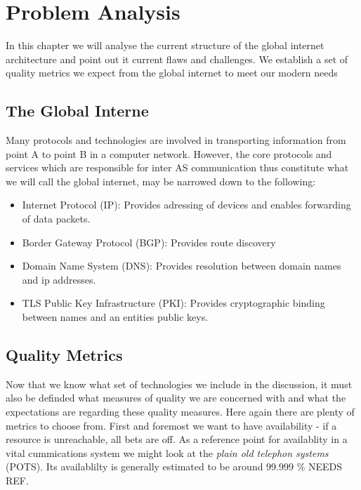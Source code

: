 \documentclass[../eva1_scion.tex]{subfiles}
\begin{document}
\chapter{Problem Analysis}\label{ch:analysis}

In this chapter we will analyse the current structure of the global internet architecture and point out it current flaws and challenges. We establish a set of quality metrics we expect from the global internet to meet our modern needs

\section{The Global Interne}%
\label{sec:the_global_internet}

Many protocols and technologies are involved in transporting information from point A to point B in a computer network. However, the core protocols and services which are responsible for inter AS  communication thus constitute what we will call the global internet, may be narrowed down to the following:

\begin{itemize}
    \item Internet Protocol (IP): Provides adressing of devices and enables forwarding of data packets.
    \item Border Gateway Protocol (BGP): Provides route discovery \cite{rfc_bgp}
    \item Domain Name System (DNS): Provides resolution between domain names and ip addresses.
    \item TLS Public Key Infrastructure (PKI): Provides cryptographic binding between names and an entities public keys.
\end{itemize}

\section{Quality Metrics}%
\label{sec:quality_metrics}

Now that we know what set of technologies we include in the discussion, it must also be definded what measures of quality we are concerned with and what the expectations are regarding these quality measures. Here again there are plenty of metrics to choose from. First and foremost we want to have availability - if a resource is unreachable, all bets are off. As a reference point for availablity in a vital cummications system we might look at the \textit{plain old telephon systems} (POTS). Its availablilty is generally estimated to be around 99.999 \% NEEDS REF.
\end{document}

